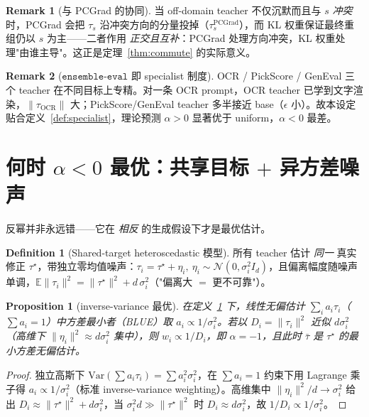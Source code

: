 \documentclass[11pt,a4paper]{article}
\newcommand{\E}{\mathbb{E}}
\newcommand{\N}{\mathcal{N}}
\newcommand{\PC}{\mathrm{PCGrad}}
\newcommand{\norm}[1]{\lVert #1\rVert}
\theoremstyle{plain}
\newtheorem{proposition}{Proposition}
\theoremstyle{definition}
\newtheorem{definition}{Definition}
\newtheorem{remark}{Remark}
\begin{document}
\begin{remark}[与 PCGrad 的协同]
当 off-domain teacher 不仅沉默而且与 $s$ \emph{冲突} 时，PCGrad 会把 $\tau_s$ 沿冲突方向的分量投掉（$\tau_s^{\PC}$），而 KL 权重保证最终重组仍以 $s$ 为主——二者作用 \emph{正交且互补}：PCGrad 处理方向冲突，KL 权重处理"由谁主导"。这正是定理~\ref{thm:commute} 的实际意义。
\end{remark}

\begin{remark}[$\texttt{ensemble-eval}$ 即 specialist 制度]
OCR / PickScore / GenEval 三个 teacher 在不同目标上专精。对一条 OCR prompt，OCR teacher 已学到文字渲染，$\norm{\tau_{\mathrm{OCR}}}$ 大；PickScore/GenEval teacher 多半接近 base（$\epsilon$ 小）。故本设定贴合定义~\ref{def:specialist}，理论预测 $\alpha>0$ 显著优于 uniform，$\alpha<0$ 最差。
\end{remark}

\section{何时 $\alpha<0$ 最优：共享目标 $+$ 异方差噪声}

反幂并非永远错——它在 \emph{相反} 的生成假设下才是最优估计。

\begin{definition}[Shared-target heteroscedastic 模型]
\label{def:shared}
所有 teacher 估计 \emph{同一} 真实修正 $\tau^\star$，带独立零均值噪声：$\tau_i=\tau^\star+\eta_i,\ \eta_i\sim\N(0,\sigma_i^2 I_d)$，且偏离幅度随噪声单调，$\E\norm{\tau_i}^2=\norm{\tau^\star}^2+d\,\sigma_i^2$（"偏离大 $=$ 更不可靠"）。
\end{definition}

\begin{proposition}[inverse-variance 最优]
\label{prop:ivw}
在定义~\ref{def:shared} 下，线性无偏估计 $\sum_i a_i\tau_i$（$\sum a_i=1$）中方差最小者（BLUE）取 $a_i\propto1/\sigma_i^2$。若以 $D_i=\norm{\tau_i}^2$ 近似 $d\sigma_i^2$（高维下 $\norm{\eta_i}^2\approx d\sigma_i^2$ 集中），则 $w_i\propto1/D_i$，即 $\alpha=-1$，且此时 $\bar\tau$ 是 $\tau^\star$ 的最小方差无偏估计。
\end{proposition}

\begin{proof}
独立高斯下 $\mathrm{Var}(\sum a_i\tau_i)=\sum a_i^2\sigma_i^2$，在 $\sum a_i=1$ 约束下用 Lagrange 乘子得 $a_i\propto1/\sigma_i^2$（标准 inverse-variance weighting）。高维集中 $\norm{\eta_i}^2/d\to\sigma_i^2$ 给出 $D_i\approx\norm{\tau^\star}^2+d\sigma_i^2$，当 $\sigma_i^2 d\gg\norm{\tau^\star}^2$ 时 $D_i\approx d\sigma_i^2$，故 $1/D_i\propto1/\sigma_i^2$。
\end{proof}
\end{document}
